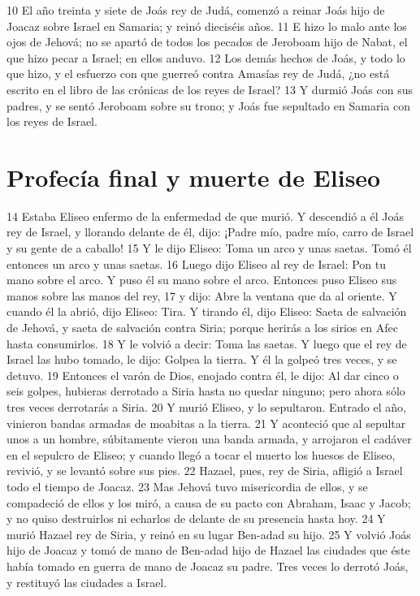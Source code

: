 10 El año treinta y siete de Joás rey de Judá, comenzó a reinar Joás hijo de Joacaz sobre Israel en Samaria; y reinó dieciséis años.
11 E hizo lo malo ante los ojos de Jehová; no se apartó de todos los pecados de Jeroboam hijo de Nabat, el que hizo pecar a Israel; en ellos anduvo.
12 Los demás hechos de Joás, y todo lo que hizo, y el esfuerzo con que guerreó contra Amasías rey de Judá, ¿no está escrito en el libro de las crónicas de los reyes de Israel?
13 Y durmió Joás con sus padres, y se sentó Jeroboam sobre su trono; y Joás fue sepultado en Samaria con los reyes de Israel.

\section*{Profecía final y muerte de Eliseo}

14 Estaba Eliseo enfermo de la enfermedad de que murió. Y descendió a él Joás rey de Israel, y llorando delante de él, dijo: ¡Padre mío, padre mío, carro de Israel y su gente de a caballo! 
15 Y le dijo Eliseo: Toma un arco y unas saetas. Tomó él entonces un arco y unas saetas.
16 Luego dijo Eliseo al rey de Israel: Pon tu mano sobre el arco. Y puso él su mano sobre el arco. Entonces puso Eliseo sus manos sobre las manos del rey,
17 y dijo: Abre la ventana que da al oriente. Y cuando él la abrió, dijo Eliseo: Tira. Y tirando él, dijo Eliseo: Saeta de salvación de Jehová, y saeta de salvación contra Siria; porque herirás a los sirios en Afec hasta consumirlos.
18 Y le volvió a decir: Toma las saetas. Y luego que el rey de Israel las hubo tomado, le dijo: Golpea la tierra. Y él la golpeó tres veces, y se detuvo.
19 Entonces el varón de Dios, enojado contra él, le dijo: Al dar cinco o seis golpes, hubieras derrotado a Siria hasta no quedar ninguno; pero ahora sólo tres veces derrotarás a Siria.
20 Y murió Eliseo, y lo sepultaron. Entrado el año, vinieron bandas armadas de moabitas a la tierra.
21 Y aconteció que al sepultar unos a un hombre, súbitamente vieron una banda armada, y arrojaron el cadáver en el sepulcro de Eliseo; y cuando llegó a tocar el muerto los huesos de Eliseo, revivió, y se levantó sobre sus pies.
22 Hazael, pues, rey de Siria, afligió a Israel todo el tiempo de Joacaz.
23 Mas Jehová tuvo misericordia de ellos, y se compadeció de ellos y los miró, a causa de su pacto con Abraham, Isaac y Jacob; y no quiso destruirlos ni echarlos de delante de su presencia hasta hoy.
24 Y murió Hazael rey de Siria, y reinó en su lugar Ben-adad su hijo.
25 Y volvió Joás hijo de Joacaz y tomó de mano de Ben-adad hijo de Hazael las ciudades que éste había tomado en guerra de mano de Joacaz su padre. Tres veces lo derrotó Joás, y restituyó las ciudades a Israel.

